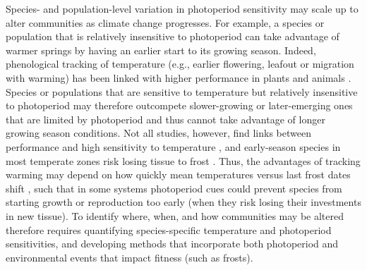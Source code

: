 \documentclass{article}
\begin{document}
\par Species- and population-level variation in photoperiod sensitivity may scale up to alter communities as climate change progresses. For example, a species or population that is relatively insensitive to photoperiod can take advantage of warmer springs by having an earlier start to its growing season. Indeed, phenological tracking of temperature (e.g., earlier flowering, leafout or migration with warming) has been linked with higher performance in plants and animals \citep{cleland2012,muir1994,willis2010}. Species or populations that are sensitive to temperature but relatively insensitive to photoperiod may therefore outcompete slower-growing or later-emerging ones that are limited by photoperiod and thus cannot take advantage of longer growing season conditions. Not all studies, however, find links between performance and high sensitivity to temperature \citep[e.g.,][]{block2020}, and early-season species in most temperate zones risk losing tissue to frost \citep{frostbook}. Thus, the advantages of tracking warming may depend on how quickly mean temperatures versus last frost dates shift \citep[e.g.,][]{inouye2002}, such that in some systems photoperiod cues could prevent species from starting growth or reproduction too early (when they risk losing their investments in new tissue). To identify where, when, and how communities may be altered therefore requires quantifying species-specific temperature and photoperiod sensitivities, and developing methods that incorporate both photoperiod and environmental events that impact fitness (such as frosts).
\end{document}
